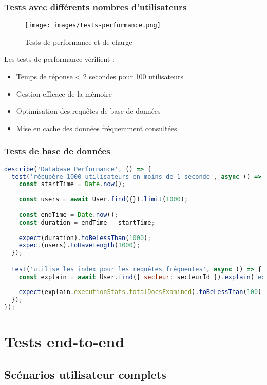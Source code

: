 \subsubsection{Tests avec différents nombres d'utilisateurs}
\begin{figure}[h]
\centering
\texttt{[image: images/tests-performance.png]}
\caption{Tests de performance et de charge}
\label{fig:tests-performance}
\end{figure}

Les tests de performance vérifient :
\begin{itemize}
    \item Temps de réponse < 2 secondes pour 100 utilisateurs
    \item Gestion efficace de la mémoire
    \item Optimisation des requêtes de base de données
    \item Mise en cache des données fréquemment consultées
\end{itemize}

\subsubsection{Tests de base de données}
\begin{lstlisting}[language=JavaScript, caption=Test de performance de base de données]
describe('Database Performance', () => {
  test('récupère 1000 utilisateurs en moins de 1 seconde', async () => {
    const startTime = Date.now();
    
    const users = await User.find({}).limit(1000);
    
    const endTime = Date.now();
    const duration = endTime - startTime;
    
    expect(duration).toBeLessThan(1000);
    expect(users).toHaveLength(1000);
  });

  test('utilise les index pour les requêtes fréquentes', async () => {
    const explain = await User.find({ secteur: secteurId }).explain('executionStats');
    
    expect(explain.executionStats.totalDocsExamined).toBeLessThan(100);
  });
});
\end{lstlisting}

\section{Tests end-to-end}
\subsection{Scénarios utilisateur complets}
